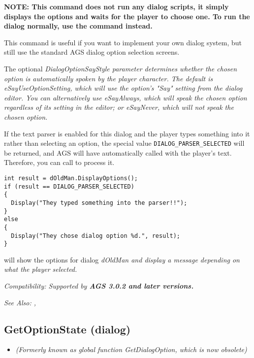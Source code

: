 \bf{NOTE:} This command does not run any dialog scripts, it simply displays
the options and waits for the player to choose one.  To run the dialog normally,
use the  command instead.

This command is useful if you want to implement your own dialog system, but still
use the standard AGS dialog option selection screens.

The optional \it{DialogOptionSayStyle} parameter determines whether the chosen option
is automatically spoken by the player character. The default is \it{eSayUseOptionSetting},
which will use the option's "Say" setting from the dialog editor. You can alternatively
use \it{eSayAlways}, which will speak the chosen option regardless of its setting
in the editor; or \it{eSayNever}, which will not speak the chosen option.

If the text parser is enabled for this dialog and the player types something into
it rather than selecting an option, the special value \verb$DIALOG_PARSER_SELECTED$
will be returned, and AGS will have automatically called 
with the player's text. Therefore, you can call 
to process it.

\begin{verbatim}
int result = dOldMan.DisplayOptions();
if (result == DIALOG_PARSER_SELECTED)
{
  Display("They typed something into the parser!!");
}
else
{
  Display("They chose dialog option %d.", result);
}
\end{verbatim}
will show the options for dialog \it{dOldMan} and display a message depending
on what the player selected.

\it{Compatibility:} Supported by \bf{AGS 3.0.2} and later versions.

\it{See Also:} ,


\subsection{GetOptionState (dialog)}\label{Dialog.GetOptionState}%

\begin{itemize}
\item \it{(Formerly known as global function GetDialogOption, which is now obsolete)}
\end{itemize}

